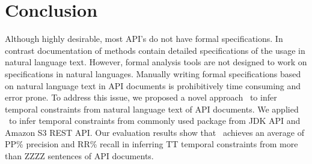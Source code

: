 \section{Conclusion}
\label{sec:conclusion}

Although highly desirable, most API's do not have formal specifications.
In contrast documentation of methods contain detailed specifications of the usage in natural language text.
However, formal analysis tools are not designed to work on specifications in natural languages.
Manually writing formal specifications based on natural language text in API documents is prohibitively time consuming and error prone.
To address this issue, we proposed a novel approach \tool\ to infer temporal constraints from natural language text of API documents.
We applied \tool\ to infer temporal constraints from 
commonly used package  from JDK API and Amazon S3 REST API.
Our evaluation results show that \tool\ achieves an average of PP\% precision and RR\% recall
in inferring TT temporal constraints from more than ZZZZ sentences of API documents.